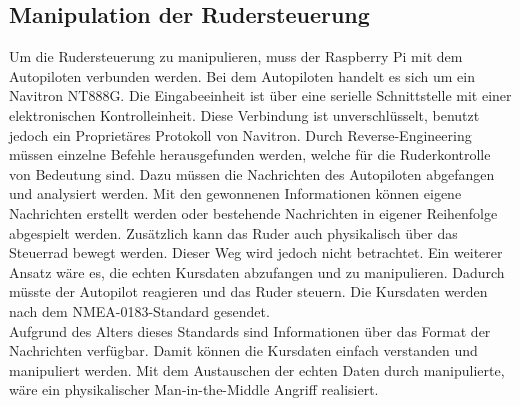 \subsection{Manipulation der Rudersteuerung}
Um die Rudersteuerung zu manipulieren, muss der Raspberry Pi mit dem Autopiloten verbunden werden. Bei dem Autopiloten
handelt es sich um ein Navitron NT888G. Die Eingabeeinheit ist über eine serielle Schnittstelle mit einer elektronischen Kontrolleinheit. 
Diese Verbindung ist unverschlüsselt, benutzt jedoch ein Proprietäres Protokoll von Navitron.
Durch Reverse-Engineering müssen einzelne Befehle herausgefunden werden, welche für die Ruderkontrolle von Bedeutung sind.
Dazu müssen die Nachrichten des Autopiloten abgefangen und analysiert werden. Mit den gewonnenen Informationen können
eigene Nachrichten erstellt werden oder bestehende Nachrichten in eigener Reihenfolge abgespielt werden.
Zusätzlich kann das Ruder auch physikalisch über das Steuerrad bewegt werden. Dieser Weg wird jedoch nicht betrachtet.
Ein weiterer Ansatz wäre es, die echten Kursdaten abzufangen und zu manipulieren. Dadurch müsste der Autopilot reagieren
und das Ruder steuern. Die Kursdaten werden nach dem NMEA-0183-Standard gesendet. \\
Aufgrund des Alters dieses Standards sind Informationen über das Format der Nachrichten verfügbar. Damit können die Kursdaten
einfach verstanden und manipuliert werden. Mit dem Austauschen der echten Daten durch manipulierte, wäre ein 
physikalischer Man-in-the-Middle Angriff realisiert.\\

